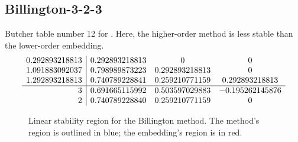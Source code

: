 \documentclass[letterpaper,10pt,english]{sphinxmanual}
\begin{document}
\subsection{Billington-3-2-3}
\label{Butcher:butcher-billington}\label{Butcher:billington-3-2-3}
Butcher table number 12
for {\hyperref[c_interface/User_callable:c.ARKodeSetIRKTableNum]{\emph{}}}.  Here, the
higher-order method is less stable than the lower-order embedding.
\begin{gather}
\begin{split}\begin{array}{r|ccc}
  0.292893218813 & 0.292893218813 & 0 & 0 \\
  1.091883092037 & 0.798989873223 & 0.292893218813 & 0 \\
  1.292893218813 & 0.740789228841 & 0.259210771159 & 0.292893218813 \\
  \hline
  3 & 0.691665115992 & 0.503597029883 & -0.195262145876 \\
  2 & 0.740789228840 & 0.259210771159 & 0
\end{array}\end{split}\notag
\end{gather}\begin{figure}[htbp]
\centering
\capstart

\caption{Linear stability region for the Billington method.  The method's
region is outlined in blue; the embedding's region is in red.}\end{figure}
\end{document}
